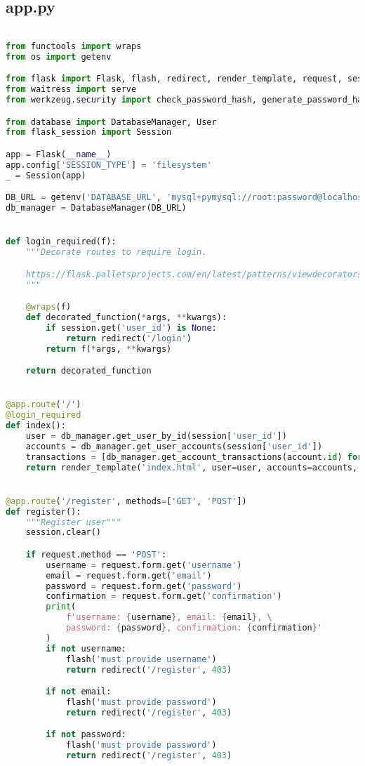 \subsection{app.py}
\begin{lstlisting}[language=Python]

from functools import wraps
from os import getenv

from flask import Flask, flash, redirect, render_template, request, session, url_for
from waitress import serve
from werkzeug.security import check_password_hash, generate_password_hash

from database import DatabaseManager, User
from flask_session import Session

app = Flask(__name__)
app.config['SESSION_TYPE'] = 'filesystem'
_ = Session(app)

DB_URL = getenv('DATABASE_URL', 'mysql+pymysql://root:password@localhost/flask_ebank')
db_manager = DatabaseManager(DB_URL)


def login_required(f):
	"""Decorate routes to require login.

	https://flask.palletsprojects.com/en/latest/patterns/viewdecorators/
	"""

	@wraps(f)
	def decorated_function(*args, **kwargs):
		if session.get('user_id') is None:
			return redirect('/login')
		return f(*args, **kwargs)

	return decorated_function


@app.route('/')
@login_required
def index():
	user = db_manager.get_user_by_id(session['user_id'])
	accounts = db_manager.get_user_accounts(session['user_id'])
	transactions = [db_manager.get_account_transactions(account.id) for account in accounts]
	return render_template('index.html', user=user, accounts=accounts, transactions=transactions)


@app.route('/register', methods=['GET', 'POST'])
def register():
	"""Register user"""
	session.clear()

	if request.method == 'POST':
		username = request.form.get('username')
		email = request.form.get('email')
		password = request.form.get('password')
		confirmation = request.form.get('confirmation')
		print(
			f'username: {username}, email: {email}, \
			password: {password}, confirmation: {confirmation}'
		)
		if not username:
			flash('must provide username')
			return redirect('/register', 403)

		if not email:
			flash('must provide password')
			return redirect('/register', 403)

		if not password:
			flash('must provide password')
			return redirect('/register', 403)


\end{lstlisting}
